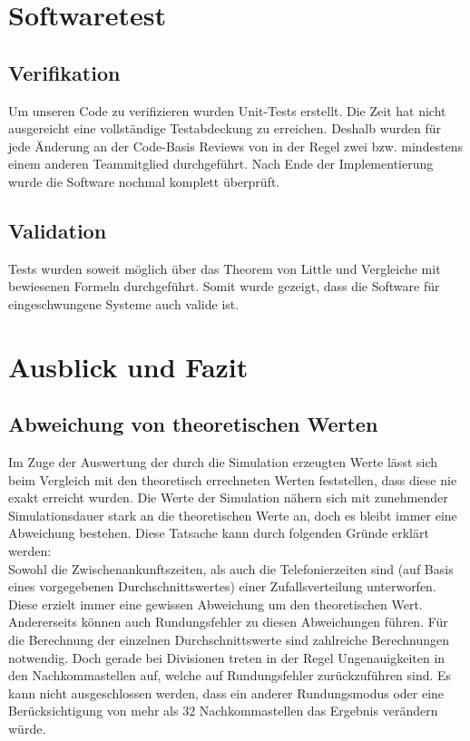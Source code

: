 \section{Softwaretest}

\subsection{Verifikation}

Um unseren Code zu verifizieren wurden Unit-Tests erstellt. Die Zeit hat nicht ausgereicht eine vollständige Testabdeckung zu erreichen. Deshalb wurden für jede Änderung an der Code-Basis Reviews von in der Regel zwei bzw. mindestens einem anderen Teammitglied durchgeführt. Nach Ende der Implementierung wurde die Software nochmal komplett überprüft.

\subsection{Validation}

Tests wurden soweit möglich über das Theorem von Little und Vergleiche mit bewiesenen Formeln durchgeführt. Somit wurde gezeigt,
dass die Software für eingeschwungene Systeme auch valide ist.


\section{Ausblick und Fazit}
\subsection{Abweichung von theoretischen Werten}
Im Zuge der Auswertung der durch die Simulation erzeugten Werte lässt sich beim Vergleich mit den theoretisch errechneten Werten feststellen, dass diese nie exakt erreicht wurden. Die Werte der Simulation nähern sich mit zunehmender Simulationsdauer stark an die theoretischen Werte an, doch es bleibt immer eine Abweichung bestehen. Diese Tatsache kann durch folgenden Gründe erklärt werden: \\

Sowohl die Zwischenankunftszeiten, als auch die Telefonierzeiten sind (auf Basis eines vorgegebenen Durchschnittswertes) einer Zufallsverteilung unterworfen. Diese erzielt immer eine gewissen Abweichung um den theoretischen Wert. \\

Andererseits können auch Rundungsfehler zu diesen Abweichungen führen. Für die Berechnung der einzelnen Durchschnittswerte sind zahlreiche Berechnungen notwendig. Doch gerade bei Divisionen treten in der Regel Ungenauigkeiten in den Nachkommastellen auf, welche auf Rundungsfehler zurückzuführen sind. Es kann nicht ausgeschlossen werden, dass ein anderer Rundungsmodus oder eine Berücksichtigung von mehr als 32 Nachkommastellen das Ergebnis verändern würde.\\

